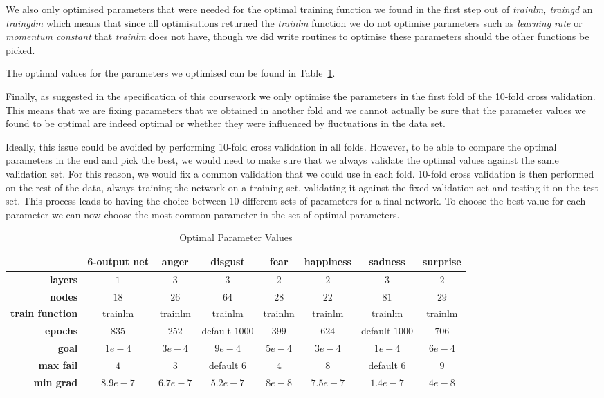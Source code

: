 \documentclass[10pt,a4paper]{article}
\begin{document}
We also only optimised parameters that were needed for the optimal training function we found in the first step out of \emph{trainlm, traingd} an \emph{traingdm} which means that since all optimisations returned the \emph{trainlm} function we do not optimise parameters such as \emph{learning rate} or \emph{momentum constant} that \emph{trainlm} does not have, though we did write routines to optimise these parameters should the other functions be picked.

The optimal values for the parameters we optimised can be found in Table~\ref{tab:optimalValues}.

Finally, as suggested in the specification of this coursework we only optimise the parameters in the first fold of the 10-fold cross validation. This means that we are fixing parameters that we obtained in another fold and we cannot actually be sure that the parameter values we found to be optimal are indeed optimal or whether they were influenced by fluctuations in the data set.

Ideally, this issue could be avoided by performing 10-fold cross validation in all folds. However, to be able to compare the optimal parameters in the end and pick the best, we would need to make sure that we always validate the optimal values against the same validation set. For this reason, we would fix a common validation that we could use in each fold. 10-fold cross validation is then performed on the rest of the data, always training the network on a training set, validating it against the fixed validation set and testing it on the test set. This process leads to having the choice between 10 different sets of parameters for a final network. To choose the best value for each parameter we can now choose the most common parameter in the set of optimal parameters.


\begin{table}
\centering
\begin{tabular}{|r|c||c|c|c|c|c|c|}
\hline 
 & \textbf{6-output net} & \textbf{anger} & \textbf{disgust} & \textbf{fear} & \textbf{happiness} & \textbf{sadness} & \textbf{surprise} \\ 
\hline 
\textbf{layers} & $1$ & $3$ & $3$ & $2$ & $2$ & $3$ & $2$ \\ 
\hline 
\textbf{nodes} & $18$ & $26$ & $64$ & $28$ & $22$ & $81$ & $29$ \\ 
\hline 
\textbf{train function} & trainlm & trainlm & trainlm & trainlm & trainlm & trainlm & trainlm\\
\hline 
\textbf{epochs} & $835$ & $252$ & default $1000$ & $399$ & $624$ & default $1000$ & $706$ \\ 
\hline 
\textbf{goal} & $1e-4$ & $3e-4$ & $9e-4$ & $5e-4$ & $3e-4$ & $1e-4$ & $6e-4$ \\ 
\hline 
\textbf{max fail} & $4$ & $3$ & default $6$ & $4$ & $8$ & default $6$ & 9 \\ 
\hline 
\textbf{min grad} & $8.9e-7$ & $6.7e-7$ & $5.2e-7$ & $8e-8$ & $7.5e-7$ & $1.4e-7$ & $4e-8$ \\ 
\hline 
\end{tabular} 
\caption{Optimal Parameter Values}
\label{tab:optimalValues}
\end{table}
\end{document}
